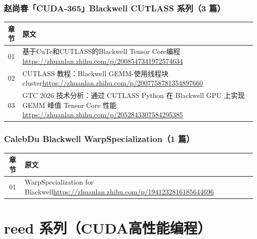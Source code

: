 \documentclass[9pt,openany]{ctexbook}
\begin{document}
\section*{赵尚春「CUDA-365」Blackwell CUTLASS 系列（3 篇）}
\begingroup\small
\begin{tabular}{@{}c>{\raggedright\arraybackslash}p{}@{}}
  \toprule
  章节 & 原文 \\
  \midrule
  01 & 基于CuTe和CUTLASS的Blackwell Tensor Core编程\newline\url{https://zhuanlan.zhihu.com/p/2008547341972574634} \\
  02 & CUTLASS 教程：Blackwell GEMM-使用线程块cluster\newline\url{https://zhuanlan.zhihu.com/p/2007758781354897660} \\
  03 & GTC 2026 技术分析：通过 CUTLASS Python 在 Blackwell GPU 上实现 GEMM 峰值 Tensor Core 性能\newline\url{https://zhuanlan.zhihu.com/p/2052843307584295385} \\
  \bottomrule
\end{tabular}
\endgroup

\section*{CalebDu Blackwell WarpSpecialization（1 篇）}
\begingroup\small
\begin{tabular}{@{}c>{\raggedright\arraybackslash}p{}@{}}
  \toprule
  章节 & 原文 \\
  \midrule
  01 & WarpSpecialization for Blackwell\newline\url{https://zhuanlan.zhihu.com/p/1941232816185644696} \\
  \bottomrule
\end{tabular}
\endgroup

\clearpage

\tableofcontents

\part{reed 系列（CUDA高性能编程）}














\end{document}

